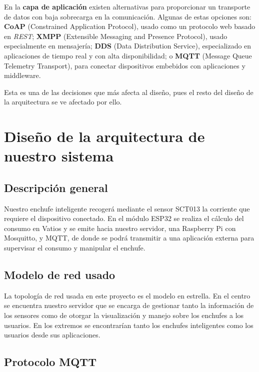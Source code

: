 \documentclass[a4paper,10pt]{article}
\begin{document}
En la \textbf{capa de aplicación} existen alternativas para
proporcionar un transporte de datos con baja sobrecarga en la
comunicación. Algunas de estas opciones
son\cite{al-fuqahaInternetThingsSurvey2015}: \textbf{CoAP}
(Constrained Application Protocol), usado como un protocolo web basado
en \textit{REST}\cite{WebServicesArchitecture}; \textbf{XMPP}
(Extensible Messaging and Presence Protocol), usado especialmente en
mensajería; \textbf{DDS} (Data Distribution Service), especializado en
aplicaciones de tiempo real y con alta disponibilidad; o \textbf{MQTT}
(Message Queue Telemetry Transport), para conectar dispositivos
embebidos con aplicaciones y middleware.

Esta es una de las decisiones que más afecta al diseño, pues el resto
del diseño de la arquitectura se ve afectado por ello.

\newpage

\section{Diseño de la arquitectura de nuestro
sistema}\label{diseuxf1o-de-la-arquitectura-de-nuestro-sistema}

\subsection{Descripción general}\label{descripciuxf3n-general}

Nuestro enchufe inteligente recogerá mediante el sensor SCT013 la
corriente que requiere el dispositivo conectado. En el módulo ESP32 se
realiza el cálculo del consumo en Vatios y se emite hacia nuestro
servidor, una Raspberry Pi con Mosquitto, y MQTT, de donde se podrá
transmitir a una aplicación externa para supervisar el consumo y
manipular el enchufe.

\subsection{Modelo de red usado}\label{modelo-de-red-usado}

La topología de red usada en este proyecto es el modelo en
estrella. En el centro se encuentra nuestro servidor que se encarga de
gestionar tanto la información de los sensores como de otorgar la
visualización y manejo sobre los enchufes a los usuarios. En los
extremos se encontrarían tanto los enchufes inteligentes como los
usuarios desde sus aplicaciones.

\subsection{Protocolo MQTT}\label{protocolo-mqtt}
\end{document}
